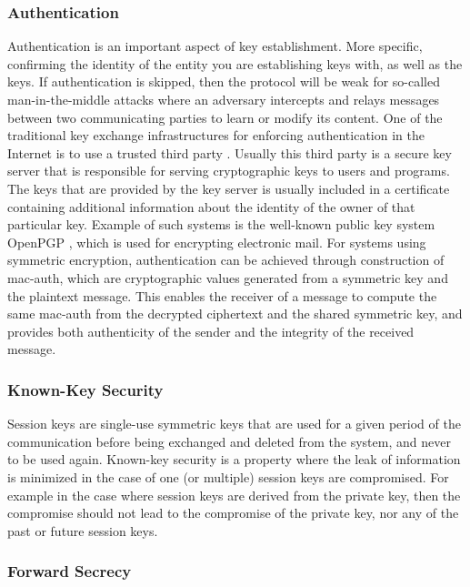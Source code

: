 \subsubsection{Authentication}

Authentication is an important aspect of key establishment. More specific, confirming the identity of the entity you are establishing keys with, as well as the keys. If authentication is skipped, then the protocol will be weak for so-called man-in-the-middle attacks where an adversary intercepts and relays messages between two communicating parties to learn or modify its content. One of the traditional key exchange infrastructures for enforcing authentication in the Internet is to use a trusted third party \cite{maurer1996modelling}. Usually this third party is a secure key server that is responsible for serving cryptographic keys to users and programs. The keys that are provided by the key server is usually included in a certificate containing additional information about the identity of the owner of that particular key. Example of such systems is the well-known public key system OpenPGP \cite{openpgp}, which is used for encrypting electronic mail. For systems using symmetric encryption, authentication can be achieved through construction of \gls{mac-auth}, which are cryptographic values generated from a symmetric key and the plaintext message. This enables the receiver of a message to compute the same \gls{mac-auth} from the decrypted ciphertext and the shared symmetric key, and provides both authenticity of the sender and the integrity of the received message.

\subsubsection{Known-Key Security}

Session keys are single-use symmetric keys that are used for a given period of the communication before being exchanged and deleted from the system, and never to be used again. Known-key security is a property where the leak of information is minimized in the case of one (or multiple) session keys are compromised. For example in the case where session keys are derived from the private key, then the compromise should not lead to the compromise of the private key, nor any of the past or future session keys. 

\subsubsection{Forward Secrecy}

